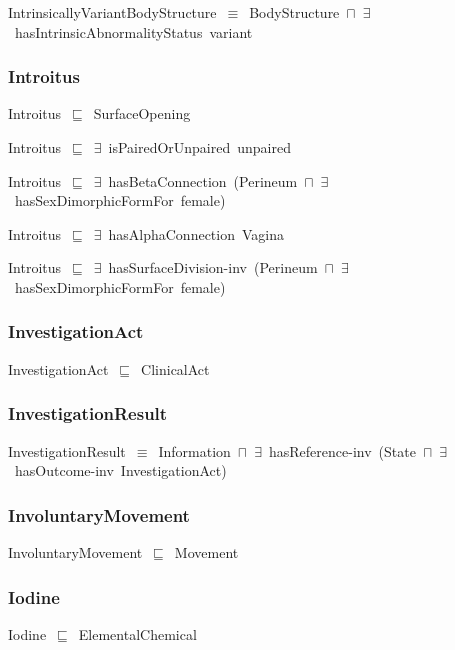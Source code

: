 \documentclass{article}
\begin{document}
IntrinsicallyVariantBodyStructure~\ensuremath{\equiv}~BodyStructure~\ensuremath{\sqcap}~\ensuremath{\exists}~hasIntrinsicAbnormalityStatus~variant

\subsubsection*{Introitus}

Introitus~\ensuremath{\sqsubseteq}~SurfaceOpening~

Introitus~\ensuremath{\sqsubseteq}~\ensuremath{\exists}~isPairedOrUnpaired~unpaired~

Introitus~\ensuremath{\sqsubseteq}~\ensuremath{\exists}~hasBetaConnection~(Perineum~\ensuremath{\sqcap}~\ensuremath{\exists}~hasSexDimorphicFormFor~female)~

Introitus~\ensuremath{\sqsubseteq}~\ensuremath{\exists}~hasAlphaConnection~Vagina~

Introitus~\ensuremath{\sqsubseteq}~\ensuremath{\exists}~hasSurfaceDivision-inv~(Perineum~\ensuremath{\sqcap}~\ensuremath{\exists}~hasSexDimorphicFormFor~female)~

\subsubsection*{InvestigationAct}

InvestigationAct~\ensuremath{\sqsubseteq}~ClinicalAct~

\subsubsection*{InvestigationResult}

InvestigationResult~\ensuremath{\equiv}~Information~\ensuremath{\sqcap}~\ensuremath{\exists}~hasReference-inv~(State~\ensuremath{\sqcap}~\ensuremath{\exists}~hasOutcome-inv~InvestigationAct)

\subsubsection*{InvoluntaryMovement}

InvoluntaryMovement~\ensuremath{\sqsubseteq}~Movement~

\subsubsection*{Iodine}

Iodine~\ensuremath{\sqsubseteq}~ElementalChemical~
\end{document}
